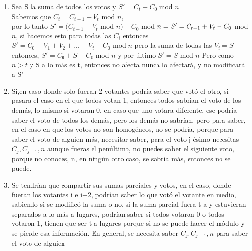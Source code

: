 \documentclass[11pt]{article}
\begin{document}
\begin{enumerate}[label=\alph*)]
\item Sea S la suma de todos los votos y $S'= C_t - C_0 $ mod $ n$\\
Sabemos que $C_t = C_{t-1} + V_t$ mod $n$, \\por lo tanto $S'= (C_{t-1} + V_t$ mod $n) - C_0 $ mod $ n \\= S'= C_{t-1} + V_t - C_0 $ mod $ n$, si hacemos esto para todas las $C_i$ entonces\\
$S'= C_0 + V_1 +V_2+...+V_t - C_0$ mod $n$ pero la suma de todas las $V_i = S$ entonces, $S' = C_0 + S - C_0 $ mod $ n $ y por último $S'= S$ mod $ n $ Pero como $n>t$ y S a lo más es t, entonces no afecta nunca lo afectará, y no modificará a S'

\item Si,en caso donde solo fueran 2 votantes podría saber que votó el otro,  si pasara el caso en el que todos votan 1, entonces todos sabrían el voto de los demás, lo mismo si votaran 0, en caso que uno votara diferente, ese podría saber el voto de todos los demás, pero los demás no sabrían, pero para saber, en el caso en que los votos no son homogéneos, no se podría, porque para saber el voto de alguien más, necesitar saber, para el voto j-ésimo necesitas $C_j, C_{j-1},n $ aunque fueras el penúltimo, no puedes saber el siguiente voto, porque no conoces, n, en ningún otro caso, se sabría más, entonces no se puede.
\item
Se tendrían que compartir sus sumas parciales y votos, en el caso, donde fueran los votantes i e i+2, podrían saber lo que votó el votante en medio, sabiendo si se modificó la suma o no,
si la suma parcial fuera t-a y estuvieran separados a lo más a lugares, podrían saber si todos votaron 0 o todos votaron 1, tienen que ser t-a lugares porque si no se puede hacer el módulo y se pierde esa información.
En general, se necesita saber  $C_j, C_{j-1},n $ para saber el voto de alguien
\end{enumerate}
    
\end{document}
